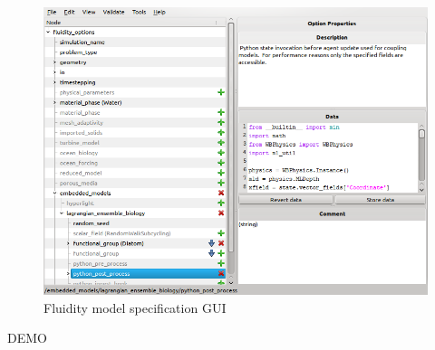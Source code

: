 \documentclass[t]{beamer}
\begin{document}
\begin{frame}[c]
\begin{minipage}{.45\textwidth}
\begin{figure}[H]
  \begin{center}
    \includegraphics[width=\textwidth,natwidth=800,natheight=600]{images/diamond.png}
    \caption{Fluidity model specification GUI}
  \end{center}
\end{figure}

\end{minipage}
\end{frame}


\begin{frame}[c]

\begin{center}
{\fontsize{48pt}{1em}\selectfont DEMO}
\end{center}

\end{frame}
\end{document}
